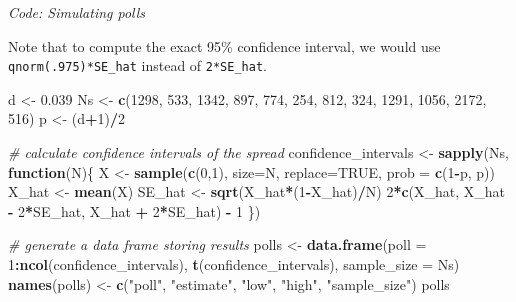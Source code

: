 \documentclass[
]{article}
\newenvironment{Shaded}{\begin{snugshade}}{\end{snugshade}}
\newcommand{\CommentTok}[1]{\textcolor[rgb]{0.56,0.35,0.01}{\textit{#1}}}
\newcommand{\ControlFlowTok}[1]{\textcolor[rgb]{0.13,0.29,0.53}{\textbf{#1}}}
\newcommand{\DataTypeTok}[1]{\textcolor[rgb]{0.13,0.29,0.53}{#1}}
\newcommand{\DecValTok}[1]{\textcolor[rgb]{0.00,0.00,0.81}{#1}}
\newcommand{\FloatTok}[1]{\textcolor[rgb]{0.00,0.00,0.81}{#1}}
\newcommand{\KeywordTok}[1]{\textcolor[rgb]{0.13,0.29,0.53}{\textbf{#1}}}
\newcommand{\NormalTok}[1]{#1}
\newcommand{\OperatorTok}[1]{\textcolor[rgb]{0.81,0.36,0.00}{\textbf{#1}}}
\newcommand{\OtherTok}[1]{\textcolor[rgb]{0.56,0.35,0.01}{#1}}
\newcommand{\StringTok}[1]{\textcolor[rgb]{0.31,0.60,0.02}{#1}}
\begin{document}
\emph{Code: Simulating polls}

Note that to compute the exact 95\% confidence interval, we would use
\texttt{qnorm(.975)*SE\_hat} instead of \texttt{2*SE\_hat}.

\begin{Shaded}
\begin{Highlighting}[]
\NormalTok{d \textless{}{-}}\StringTok{ }\FloatTok{0.039}
\NormalTok{Ns \textless{}{-}}\StringTok{ }\KeywordTok{c}\NormalTok{(}\DecValTok{1298}\NormalTok{, }\DecValTok{533}\NormalTok{, }\DecValTok{1342}\NormalTok{, }\DecValTok{897}\NormalTok{, }\DecValTok{774}\NormalTok{, }\DecValTok{254}\NormalTok{, }\DecValTok{812}\NormalTok{, }\DecValTok{324}\NormalTok{, }\DecValTok{1291}\NormalTok{, }\DecValTok{1056}\NormalTok{, }\DecValTok{2172}\NormalTok{, }\DecValTok{516}\NormalTok{)}
\NormalTok{p \textless{}{-}}\StringTok{ }\NormalTok{(d}\OperatorTok{+}\DecValTok{1}\NormalTok{)}\OperatorTok{/}\DecValTok{2}

\CommentTok{\# calculate confidence intervals of the spread}
\NormalTok{confidence\_intervals \textless{}{-}}\StringTok{ }\KeywordTok{sapply}\NormalTok{(Ns, }\ControlFlowTok{function}\NormalTok{(N)\{}
\NormalTok{    X \textless{}{-}}\StringTok{ }\KeywordTok{sample}\NormalTok{(}\KeywordTok{c}\NormalTok{(}\DecValTok{0}\NormalTok{,}\DecValTok{1}\NormalTok{), }\DataTypeTok{size=}\NormalTok{N, }\DataTypeTok{replace=}\OtherTok{TRUE}\NormalTok{, }\DataTypeTok{prob =} \KeywordTok{c}\NormalTok{(}\DecValTok{1}\OperatorTok{{-}}\NormalTok{p, p))}
\NormalTok{    X\_hat \textless{}{-}}\StringTok{ }\KeywordTok{mean}\NormalTok{(X)}
\NormalTok{    SE\_hat \textless{}{-}}\StringTok{ }\KeywordTok{sqrt}\NormalTok{(X\_hat}\OperatorTok{*}\NormalTok{(}\DecValTok{1}\OperatorTok{{-}}\NormalTok{X\_hat)}\OperatorTok{/}\NormalTok{N)}
    \DecValTok{2}\OperatorTok{*}\KeywordTok{c}\NormalTok{(X\_hat, X\_hat }\OperatorTok{{-}}\StringTok{ }\DecValTok{2}\OperatorTok{*}\NormalTok{SE\_hat, X\_hat }\OperatorTok{+}\StringTok{ }\DecValTok{2}\OperatorTok{*}\NormalTok{SE\_hat) }\OperatorTok{{-}}\StringTok{ }\DecValTok{1}
\NormalTok{\})}

\CommentTok{\# generate a data frame storing results}
\NormalTok{polls \textless{}{-}}\StringTok{ }\KeywordTok{data.frame}\NormalTok{(}\DataTypeTok{poll =} \DecValTok{1}\OperatorTok{:}\KeywordTok{ncol}\NormalTok{(confidence\_intervals),}
                    \KeywordTok{t}\NormalTok{(confidence\_intervals), }\DataTypeTok{sample\_size =}\NormalTok{ Ns)}
\KeywordTok{names}\NormalTok{(polls) \textless{}{-}}\StringTok{ }\KeywordTok{c}\NormalTok{(}\StringTok{"poll"}\NormalTok{, }\StringTok{"estimate"}\NormalTok{, }\StringTok{"low"}\NormalTok{, }\StringTok{"high"}\NormalTok{, }\StringTok{"sample\_size"}\NormalTok{)}
\NormalTok{polls}
\end{Highlighting}
\end{Shaded}
\end{document}
